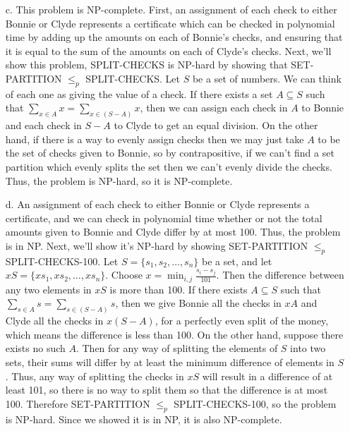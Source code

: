 \documentclass{article}
\begin{document}
\begin{enumerate}
    \item[c.] This problem is NP-complete. First, an assignment of each check to either Bonnie or Clyde represents a certificate which can be checked in polynomial time by adding up the amounts on each of Bonnie's checks, and ensuring that it is equal to the sum of the amounts on each of Clyde’s checks. Next, we'll show this problem, SPLIT-CHECKS is NP-hard by showing that SET-PARTITION \(\leq_p\) SPLIT-CHECKS. Let \( S \) be a set of numbers. We can think of each one as giving the value of a check. If there exists a set \( A \subseteq S \) such that \( \sum_{x \in A} x = \sum_{x \in (S - A)} x \), then we can assign each check in \( A \) to Bonnie and each check in \( S - A \) to Clyde to get an equal division. On the other hand, if there is a way to evenly assign checks then we may just take \( A \) to be the set of checks given to Bonnie, so by contrapositive, if we can’t find a set partition which evenly splits the set then we can’t evenly divide the checks. Thus, the problem is NP-hard, so it is NP-complete.
    \item[d.] An assignment of each check to either Bonnie or Clyde represents a certificate, and we can check in polynomial time whether or not the total amounts given to Bonnie and Clyde differ by at most 100. Thus, the problem is in NP. Next, we'll show it’s NP-hard by showing SET-PARTITION \(\leq_p\) SPLIT-CHECKS-100. Let \( S = \{s_1, s_2, \ldots, s_n\} \) be a set, and let \( xS = \{xs_1, xs_2, \ldots, xs_n\} \). Choose \( x = \min_{i,j} \frac{s_i - s_j}{101} \). Then the difference between any two elements in \( xS \) is more than 100. If there exists \( A \subseteq S \) such that \( \sum_{s \in A} s = \sum_{s \in (S - A)} s \), then we give Bonnie all the checks in \( xA \) and Clyde all the checks in \( x(S - A) \), for a perfectly even split of the money, which means the difference is less than 100. On the other hand, suppose there exists no such \( A \). Then for any way of splitting the elements of \( S \) into two sets, their sums will differ by at least the minimum difference of elements in \( S \). Thus, any way of splitting the checks in \( xS \) will result in a difference of at least 101, so there is no way to split them so that the difference is at most 100. Therefore SET-PARTITION \(\leq_p\) SPLIT-CHECKS-100, so the problem is NP-hard. Since we showed it is in NP, it is also NP-complete.

\end{enumerate}
\end{document}
